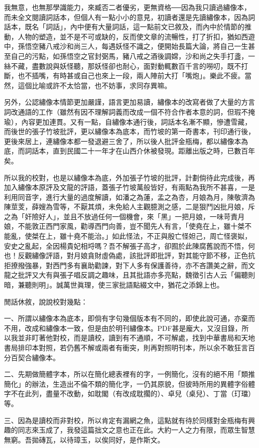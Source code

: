 我無意，也無那學識能力，來臧否二者優劣，更無資格──因為我只讀過繡像本，而未全文閱讀詞話本，但個人有一點小小的意見，初讀者還是先讀繡像本，因為詞話本，既名「詞話」，內中便有大量詞話，這一點前文已敘及，而內中於情節的推動，人物的塑造，並不是不可或缺的，反而使文章的流暢性，打了折扣，猶如西遊中，孫悟空豬八戒沙和尚三人，每遇妖怪不識之，便開始長篇大論，將自己一生甚至自己的污點，如孫悟空之官封弼馬，豬八戒之酒後調嫦，沙和尚之失手打盞，一絲不藏，盡數說與妖怪聽，那妖怪卻也耐心，面對動輒數百千言的嘮叨，既不打斷，也不插嘴，有時甚或自己也來上一段，兩人陣前大打「嘴炮」。樂此不疲。當然，這個比喻或許不太恰當，也不妨事，求同存異嘛。

另外，公認繡像本情節更加嚴謹，語言更加易讀，繡像本的改寫者做了大量的方言詞改通語的工作（雖然有因不理解詞義而改成一個不符合作者本意的詞，但瑕不掩瑜），內容更加連貫。又有一點，自繡像本通行後，詞話本名漸不顯，慘遭雪藏，而後世的張子竹坡批評，更以繡像本為底本，而竹坡的第一奇書本，刊印通行後，更後來居上，連繡像本都一發退避三舍了，所以後人批評金瓶梅，都以繡像本為底，而詞話本，直到民國二十一年才在山西介休被發現。距離出版之時，已數百年矣。

所以我的校對，也是以繡像本為底，外加張子竹坡的批評，計劃倘待此完成後，再加入繡像本原評及文龍的評語，蓋張子竹坡萬般皆好，有兩點為我所不甚喜，一是利用同音字，進行大量的過度解讀，如潘之為蓮，孟之為杏，月娘為月，陳敬濟為陳莖芰，薛嫂為雪等，不厭其煩，未免給人主觀臆測之感，二是狠鬥凶批月娘，斥之為「奸險好人」，並且不放過任何一個機會，來「黑」一把月娘，一味苛責月娘，不能敦正西門家風，勸導西門向善，豈不聞先人有言，「使堯在上，雖十桀不能亂，使桀在上，雖十堯不能治。」如此怪法，不正與殷亡怪妲己，周亡怪褒姒，安史之亂起，全因楊貴妃相埒嗎？吾不解張子高才，卻囿於此陳腐舊說而不悟，何也！反觀繡像評語，對月娘貪財虛偽處，該批評即批評，對其能守節不移，正色抗拒撩撥強暴，對西門多有襄助勸諫，對下人多有保護善待，亦不吝讚美之辭，而文龍之批評又大有與張子唱反調之趣味，且其批語亦多亮點，魏徵引古人云「偏聽則暗，兼聽則明」。誠萬世眞理，使三家批語點綴文中，猶花之添錦上也。

閒話休敘，說說校對幾點：

一、所謂以繡像本為底本，即倘有字句幾個版本有不同的，即使此說可通，亦棄而不用，改成和繡像本一致，但是由於明刊繡像本。PDF甚是龐大，又沒目錄，所以我並非盯著他對校，而是讀校，讀到有不通順，不可解處，找到中華書局和天地書局排印本對照，若仍舊不解或兩者有衝突，則再對照明刊本，所以余不敢狂言百分百契合繡像本。

二、先期做簡體字本，所以在簡化總表裡有的字，一例簡化，沒有的絕不用「類推簡化」的辦法，生造出不倫不類的簡化字，一仍其原貌，但彼時所用的異體字俗體字不在此列，盡量不改動，如耽閣（有改成耽擱的）、卓兒（桌兒）、丁當（玎璫）等。

三、因為是讀校而非對校，所以肯定有漏網之魚，這點就有待於同樣對金瓶梅有興趣的同志來玉成了，我發這篇拙文之意也正在此。大約一人之力有限，而眾生智慧無窮。吾拋磚瓦，以待璋玉，以俟同好，是作斯文。

\begin{quotation}
\end{quotation}
